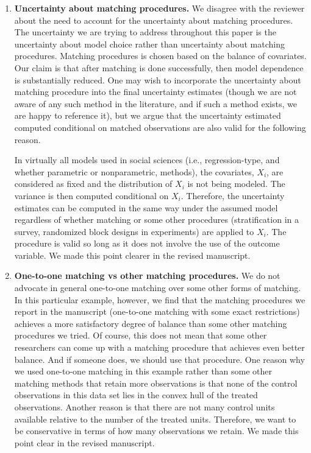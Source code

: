 \documentclass[11pt]{article}
\begin{document}
\begin{enumerate}
\item {\bf Uncertainty about matching procedures.} We disagree with
  the reviewer about the need to account for the uncertainty about
  matching procedures. The uncertainty we are trying to address
  throughout this paper is the uncertainty about model choice rather
  than uncertainty about matching procedures. Matching procedures is
  chosen based on the balance of covariates. Our claim is that after
  matching is done successfully, then model dependence is
  substantially reduced. One may wish to incorporate the uncertainty
  about matching procedure into the final uncertainty estimates
  (though we are not aware of any such method in the literature, and
  if such a method exists, we are happy to reference it), but we
  argue that the uncertainty estimated computed conditional on matched
  observations are also valid for the following reason.

  In virtually all models used in social sciences (i.e.,
  regression-type, and whether parametric or nonparametric, methods),
  the covariates, $X_i$, are considered as fixed and the distribution
  of $X_i$ is not being modeled. The variance is then computed
  conditional on $X_i$.  Therefore, the uncertainty estimates can be
  computed in the same way under the assumed model regardless of
  whether matching or some other procedures (stratification in a
  survey, randomized block designs in experiments) are applied to
  $X_i$. The procedure is valid so long as it does not involve the use
  of the outcome variable.  We made this point clearer in the revised
  manuscript.

\item {\bf One-to-one matching vs other matching procedures.} We do
  not advocate in general one-to-one matching over some other forms of
  matching. In this particular example, however, we find that the
  matching procedures we report in the manuscript (one-to-one matching
  with some exact restrictions) achieves a more satisfactory degree of
  balance than some other matching procedures we tried. Of course,
  this does not mean that some other researchers can come up with a
  matching procedure that achieves even better balance. And if someone
  does, we should use that procedure. One reason why we used
  one-to-one matching in this example rather than some other matching
  methods that retain more observations is that none of the control
  observations in this data set lies in the convex hull of the treated
  observations. Another reason is that there are not many control
  units available relative to the number of the treated units.
  Therefore, we want to be conservative in terms of how many
  observations we retain. We made this point clear in the revised
  manuscript.



\end{enumerate}
\end{document}
